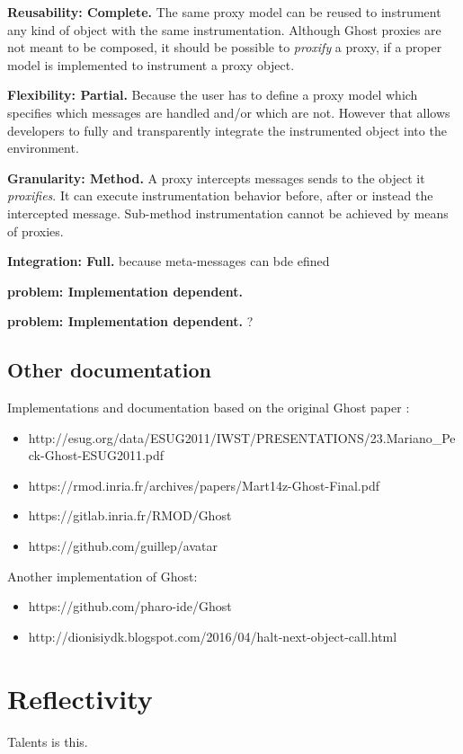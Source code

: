 \documentclass[10pt,twoside,english]{_support/latex/sbabook/sbabook}
\begin{document}
\textbf{Reusability: Complete.} The same proxy model can be reused to instrument any kind of object with the same instrumentation. Although Ghost proxies are not meant to be composed, it should be possible to \textit{proxify} a proxy, if a proper model is implemented to instrument a proxy object.

\textbf{Flexibility: Partial.} Because the user has to define a proxy model which specifies which messages are handled and/or which are not. However that allows developers to fully and transparently integrate the instrumented object into the environment.

\textbf{Granularity: Method.} A proxy intercepts messages sends to the object it \textit{proxifies}. It can execute instrumentation behavior before, after or instead the intercepted message. Sub-method instrumentation cannot be achieved by means of proxies.

\textbf{Integration: Full.} because meta-messages can bde efined

\textbf{ problem: Implementation dependent.}

\textbf{ problem: Implementation dependent.} ?
\section{Other documentation}
Implementations and documentation based on the original Ghost paper \cite{Mart14z}:

\begin{itemize}
\item http://esug.org/data/ESUG2011/IWST/PRESENTATIONS/23.Mariano\_Peck-Ghost-ESUG2011.pdf
\item https://rmod.inria.fr/archives/papers/Mart14z-Ghost-Final.pdf
\item https://gitlab.inria.fr/RMOD/Ghost
\item https://github.com/guillep/avatar
\end{itemize}

Another implementation of Ghost:

\begin{itemize}
\item https://github.com/pharo-ide/Ghost
\item http://dionisiydk.blogspot.com/2016/04/halt-next-object-call.html
\end{itemize}
\chapter{Reflectivity}
Talents \cite{ressia2014talents}is this.
\end{document}
